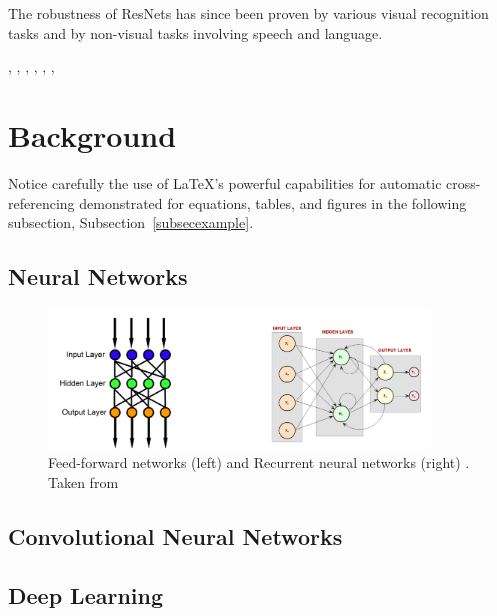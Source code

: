 \documentclass[12pt]{article}
\numberwithin{equation}{section}
\numberwithin{table}{section}
\numberwithin{figure}{section}
\begin{document}
The robustness of ResNets has since been proven by various visual recognition tasks and by non-visual tasks involving speech and language\cite{Michael:Online}.





\cite{He2016}, \cite{Veit2016}, \cite{Wu2017}, \cite{Xie2016} , \cite{Zagoruyko2016}, \cite{Long2016}
, \cite{Huang2016}


\section{Background} \label{secimport}

Notice carefully the use of \LaTeX's powerful capabilities for automatic
cross-referencing demonstrated
for equations, tables, and figures
in the following subsection,
Subsection~\ref{subsecexample}.

\subsection{Neural Networks}

\begin{figure}[H] \centering
	\includegraphics[width=0.9\textwidth]{image7.png}
	\caption{Feed-forward networks (left) and Recurrent neural networks (right) .  Taken from  }
	\label{figre7}
\end{figure}


\subsection{Convolutional Neural Networks}


\subsection{Deep Learning}
\end{document}
